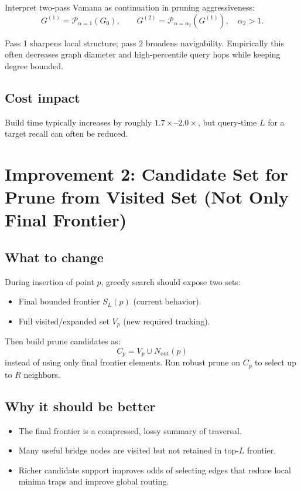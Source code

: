 \documentclass[11pt]{article}
\begin{document}
Interpret two-pass Vamana as continuation in pruning aggressiveness:
\begin{equation}
G^{(1)} = \mathcal{P}_{\alpha=1}(G_0),\qquad G^{(2)} = \mathcal{P}_{\alpha=\alpha_2}(G^{(1)}),\quad \alpha_2>1.
\end{equation}

Pass 1 sharpens local structure; pass 2 broadens navigability. Empirically this often decreases graph diameter and high-percentile query hops while keeping degree bounded.

\subsection{Cost impact}
Build time typically increases by roughly $1.7\times$--$2.0\times$, but query-time $L$ for a target recall can often be reduced.

\section{Improvement 2: Candidate Set for Prune from Visited Set (Not Only Final Frontier)}

\subsection{What to change}
During insertion of point $p$, greedy search should expose two sets:
\begin{itemize}[leftmargin=*]
    \item Final bounded frontier $S_L(p)$ (current behavior).
    \item Full visited/expanded set $V_p$ (new required tracking).
\end{itemize}

Then build prune candidates as:
\begin{equation}
C_p = V_p \cup N_{\text{out}}(p)
\end{equation}
instead of using only final frontier elements. Run robust prune on $C_p$ to select up to $R$ neighbors.

\subsection{Why it should be better}
\begin{itemize}[leftmargin=*]
    \item The final frontier is a compressed, lossy summary of traversal.
    \item Many useful bridge nodes are visited but not retained in top-$L$ frontier.
    \item Richer candidate support improves odds of selecting edges that reduce local minima traps and improve global routing.
\end{itemize}
\end{document}
